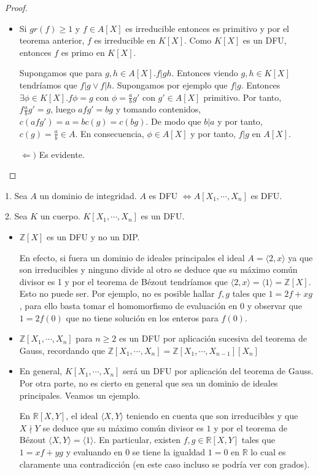 \begin{proof}
\begin{itemize}
\item Si $gr(f) \ge 1$ y $f \in A[X]$ es irreducible entonces es primitivo y por el teorema anterior, $f$ es irreducible en $K[X]$. Como $K[X]$ es un DFU, entonces $f$ es primo en $K[X]$. 

Supongamos que para $g,h \in A[X].f|gh$. Entonces viendo $g,h \in K[X]$ tendríamos que $f|g \lor f|h$. Supongamos por ejemplo que $f|g$. Entonces $\exists \phi \in K[X].f \phi = g$ con $\phi = \frac{a}{b}g'$ con $g' \in A[X]$ primitivo. Por tanto, $f \frac{a}{b} g' = g$, luego $afg' = bg$ y tomando contenidos, $c(afg') = a = b c(g) = c(bg)$. De modo que $b|a$ y por tanto, $c(g) = \frac{a}{b} \in A$. En consecuencia, $\phi \in A[X]$ y por tanto, $f|g$ en $A[X]$.

$\Leftarrow)$ Es evidente. 
\end{itemize}
\end{proof}

\begin{corollary}
1. Sea $A$ un dominio de integridad. $A$ es DFU $\iff A[X_1,\cdots,X_n]$ es DFU. 

2. Sea $K$ un cuerpo. $K[X_1,\cdots,X_n]$ es un DFU. 
\end{corollary}


\begin{example}
\begin{itemize}
\item $\mathbb{Z}[X]$ es un DFU y no un DIP. 

En efecto, si fuera un dominio de ideales principales el ideal $A = \langle 2,x \rangle$ ya que son irreducibles y ninguno divide al otro se deduce que su máximo común divisor es 1 y por el teorema de Bézout tendríamos que $\langle 2,x \rangle = \langle 1 \rangle = \mathbb{Z}[X]$. Esto no puede ser. Por ejemplo, no es posible hallar $f,g$ tales que $1 = 2f+xg$, para ello basta tomar el homomorfismo de evaluación en $0$ y observar que $1 = 2f(0)$ que no tiene solución en los enteros para $f(0)$. 
\item $\mathbb{Z}[X_1,\cdots,X_n]$ para $n \ge 2$ es un DFU por aplicación sucesiva del teorema de Gauss, recordando que $\mathbb{Z}[X_1,\cdots,X_n] = \mathbb{Z}[X_1,\cdots,X_{n-1}][X_n]$
\item En general, $K[X_1,\cdots,X_n]$ será un DFU por aplicación del teorema de Gauss. Por otra parte, no es cierto en general que sea un dominio de ideales principales. Veamos un ejemplo.

En $\mathbb{R}[X,Y]$, el ideal $\langle X,Y \rangle$ teniendo en cuenta que son irreducibles y que $X \nmid Y$ se deduce que su máximo común divisor es $1$ y por el teorema de Bézout $\langle X,Y \rangle = \langle 1 \rangle$. En particular, existen $f,g \in \mathbb{R}[X,Y]$ tales que $1 = xf+yg$ y evaluando en $0$ se tiene la igualdad $1 = 0$ en $\mathbb{R}$ lo cual es claramente una contradicción (en este caso incluso se podría ver con grados).
\end{itemize}
\end{example}


